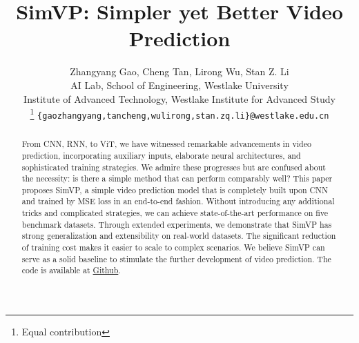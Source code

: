 \documentclass[10pt,twocolumn,letterpaper]{article}
\begin{document}
\title{SimVP: Simpler yet Better Video Prediction}

\author{Zhangyang Gao, Cheng Tan,  Lirong Wu, Stan Z. Li \\
 AI Lab, School of Engineering, Westlake University \\
 Institute of Advanced Technology, Westlake Institute for Advanced Study \\
\thanks{Equal contribution}
{\tt\small \{gaozhangyang,tancheng,wulirong,stan.zq.li\}@westlake.edu.cn}
}

\maketitle

\begin{abstract}
  From CNN, RNN, to ViT, we have witnessed remarkable advancements in video prediction, incorporating auxiliary inputs, elaborate neural architectures, and sophisticated training strategies. We admire these progresses but are confused about the necessity: is there a simple method that can perform comparably well? This paper proposes SimVP, a simple video prediction model that is completely built upon CNN and trained by MSE loss in an end-to-end fashion. Without introducing any additional tricks and complicated strategies, we can achieve state-of-the-art performance on five benchmark datasets. Through extended experiments, we demonstrate that SimVP has strong generalization and extensibility on real-world datasets. The significant reduction of training cost makes it easier to scale to complex scenarios. We believe SimVP can serve as a solid baseline to stimulate the further development of video prediction. The code is available at \href{https://github.com/gaozhangyang/SimVP-Simpler-yet-Better-Video-Prediction}{Github}.

\end{abstract}
\end{document}
